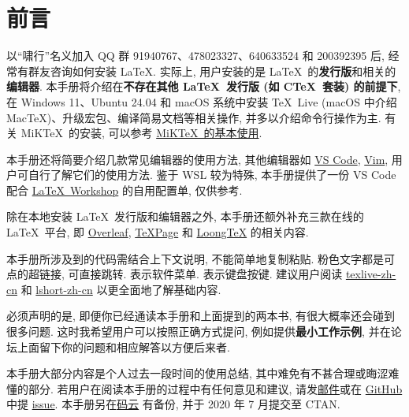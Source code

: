 
\chapter*{前言}

以``啸行''名义加入 QQ 群 91940767、478023327、640633524 和 200392395 后,
经常有群友咨询如何安装 \LaTeX.
实际上,
用户安装的是 \LaTeX\ 的\textbf{发行版}和相关的\textbf{编辑器}.
本手册将介绍在\textbf{不存在其他 \LaTeX\ 发行版 (如 C\TeX\ 套装) 的前提下},
在 Windows 11、Ubuntu 24.04 和 macOS 系统中安装
\TeX\ Live (macOS 中介绍 Mac\TeX)、升级宏包、编译简易文档等相关操作,
并多以介绍命令行操作为主.
有关 MiK\TeX\ 的安装,
可以参考 \href{https://camusecao.top/2021-06-16/MiKTeX/}{MiK\TeX\ 的基本使用}.

本手册还将简要介绍几款常见编辑器的使用方法,
其他编辑器如 \href{https://code.visualstudio.com/}{VS Code},
\href{https://www.vim.org/}{Vim},
用户可自行了解它们的使用方法.
鉴于 WSL 较为特殊,
本手册提供了一份 VS Code 配合
\href{https://marketplace.visualstudio.com/items?itemName=James-Yu.latex-workshop}{\LaTeX\ Workshop}
的自用配置单,
仅供参考.

除在本地安装 \LaTeX\ 发行版和编辑器之外,
本手册还额外补充三款在线的 \LaTeX\ 平台,
即 \href{http://www.overleaf.com}{Overleaf},
\href{https://www.texpage.com/}{TeXPage} 和
\href{https://www.loongtex.com/}{LoongTeX} 的相关内容.

本手册所涉及到的代码需结合上下文说明, 不能简单地复制粘贴.
粉色文字都是可点的超链接, 可直接跳转.
 表示软件菜单.  表示键盘按键.
建议用户阅读 \href{https://tug.org/texlive/doc/texlive-zh-cn/texlive-zh-cn.pdf}{\textsf{texlive-zh-cn}}
和 \href{http://mirrors.ctan.org/info/lshort/chinese/lshort-zh-cn.pdf}{\textsf{lshort-zh-cn}}
以更全面地了解基础内容.

必须声明的是,
即便你已经通读本手册和上面提到的两本书,
有很大概率还会碰到很多问题.
这时我希望用户可以按照正确方式提问,
例如提供\textbf{最小工作示例},
并在论坛上面留下你的问题和相应解答以方便后来者.

本手册大部分内容是个人过去一段时间的使用总结, 其中难免有不甚合理或晦涩难懂的部分. 
若用户在阅读本手册的过程中有任何意见和建议,
请发\href{mailto:ranwang.osbert@outlook.com}{邮件}或在
\href{https://github.com/OsbertWang/install-latex-guide-zh-cn}{GitHub} 中提
\href{https://github.com/OsbertWang/install-latex-guide-zh-cn/issues}{issue}.
本手册另在\href{https://gitee.com/OsbertWang/install-latex-guide-zh-cn}{码云}%
有备份,
并于 2020 年 7 月提交至 CTAN.

